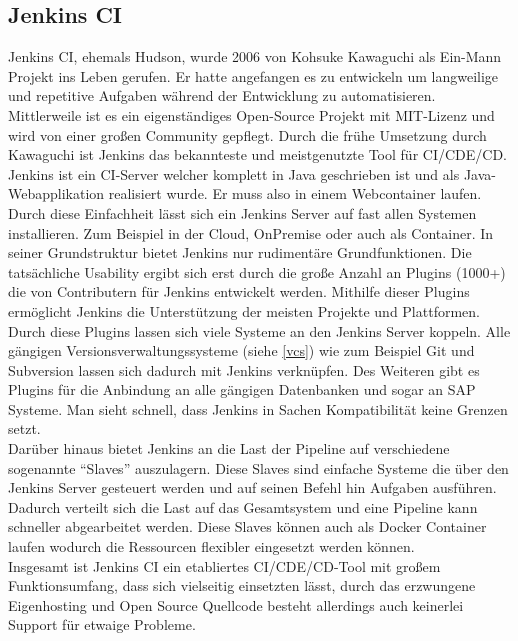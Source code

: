 \subsection{Jenkins CI} Jenkins CI, ehemals Hudson, wurde 2006 von Kohsuke Kawaguchi als Ein-Mann Projekt ins Leben gerufen. Er hatte angefangen es zu entwickeln um langweilige und repetitive Aufgaben während der Entwicklung zu automatisieren. Mittlerweile ist es ein eigenständiges Open-Source Projekt mit MIT-Lizenz und wird von einer großen Community gepflegt. Durch die frühe Umsetzung durch Kawaguchi ist Jenkins das bekannteste und meistgenutzte Tool für \ac{CI}/\ac{CDE}/\ac{CD}.\\
Jenkins ist ein CI-Server welcher komplett in Java geschrieben ist und als Java-Webapplikation realisiert wurde. Er muss also in einem Webcontainer laufen. Durch diese Einfachheit lässt sich ein Jenkins Server auf fast allen Systemen installieren. Zum Beispiel in der Cloud, OnPremise oder auch als Container. In seiner Grundstruktur bietet Jenkins nur rudimentäre Grundfunktionen. Die tatsächliche Usability ergibt sich erst durch die große Anzahl an Plugins (1000+) die von Contributern für Jenkins entwickelt werden. Mithilfe dieser Plugins ermöglicht Jenkins die Unterstützung der meisten Projekte und Plattformen.\\
Durch diese Plugins lassen sich viele Systeme an den Jenkins Server koppeln. Alle gängigen Versionsverwaltungssysteme (siehe \ref{vcs}) wie zum Beispiel Git und Subversion lassen sich dadurch mit Jenkins verknüpfen. Des Weiteren gibt es Plugins für die Anbindung an alle gängigen Datenbanken und sogar an SAP Systeme. Man sieht schnell, dass Jenkins in Sachen Kompatibilität keine Grenzen setzt.\\
Darüber hinaus bietet Jenkins an die Last der Pipeline auf verschiedene sogenannte \enquote{Slaves} auszulagern. Diese Slaves sind einfache Systeme die über den Jenkins Server gesteuert werden und auf seinen Befehl hin Aufgaben ausführen. Dadurch verteilt sich die Last auf das Gesamtsystem und eine Pipeline kann schneller abgearbeitet werden. Diese Slaves können auch als Docker Container laufen wodurch die Ressourcen flexibler eingesetzt werden können.\\
Insgesamt ist Jenkins CI ein etabliertes \ac{CI}/\ac{CDE}/\ac{CD}-Tool mit großem Funktionsumfang, dass sich vielseitig einsetzten lässt, durch das erzwungene Eigenhosting und Open Source Quellcode besteht allerdings auch keinerlei Support für etwaige Probleme.
